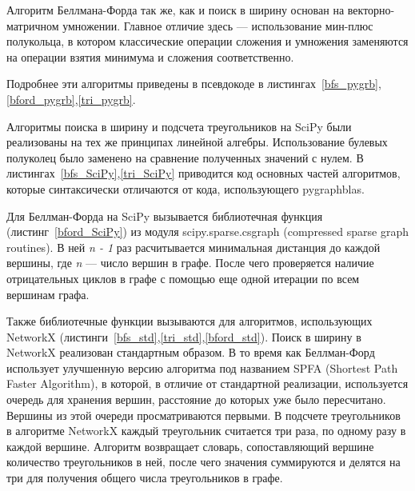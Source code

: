 Алгоритм Беллмана-Форда так же, как и поиск в ширину основан на векторно-матричном умножении. Главное отличие 
здесь --- использование мин-плюс полукольца, в котором классические операции сложения и умножения заменяются 
на операции взятия минимума и сложения соответственно. 

Подробнее эти алгоритмы приведены в псевдокоде в листингах~\ref{bfs_pygrb},\ref{bford_pygrb},\ref{tri_pygrb}.

Алгоритмы поиска в ширину и подсчета треугольников на SciPy были реализованы на тех же принципах линейной алгебры. 
Использование булевых полуколец было заменено на сравнение полученных значений с нулем. В
листингах~\ref{bfs_SciPy},\ref{tri_SciPy} приводится код основных частей алгоритмов, которые синтаксически 
отличаются от кода, использующего pygraphblas.

Для Беллман-Форда на SciPy вызывается библиотечная функция (листинг~\ref{bford_SciPy}) из модуля scipy.sparse.csgraph 
(compressed sparse graph routines). В ней \emph{n - 1} раз расчитывается минимальная дистанция до каждой вершины, 
где \emph{n} --- число вершин в графе. После чего проверяется наличие отрицательных циклов в графе с помощью еще 
одной итерации по всем вершинам графа.

Также библиотечные функции вызываются для алгоритмов, использующих NetworkX 
(листинги~\ref{bfs_std},\ref{tri_std},\ref{bford_std}). Поиск в ширину в NetworkX реализован стандартным образом. 
В то время как Беллман-Форд использует улучшенную версию алгоритма под названием SPFA (Shortest Path Faster Algorithm), 
в которой, в отличие от стандартной реализации, используется очередь для хранения вершин, расстояние до которых 
уже было пересчитано. Вершины из этой очереди просматриваются первыми. В подсчете треугольников в алгоритме 
NetworkX каждый треугольник считается три раза, по одному разу в каждой вершине. Алгоритм возвращает словарь, 
сопоставляющий вершине количество треугольников в ней, после чего значения суммируются и делятся на три для 
получения общего числа треугольников в графе.

\vspace{10px}

